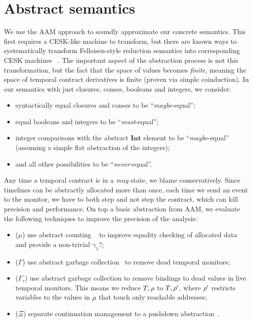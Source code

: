 \section{Abstract semantics}

We use the AAM approach to soundly approximate our concrete semantics.
%
This first requires a CESK-like machine to transform, but there are known ways to systematically transform Felleisen-style reduction semantics into corresponding CESK machines ~\citep{dvanhorn:Danvy-Nielsen:RS-04-26}.
%
The important aspect of the abstraction process is not this transformation, but the fact that the space of values becomes \emph{finite}, meaning the space of temporal contract derivatives is finite (proven via simple coinduction).
%
In our semantics with just closures, conses, booleans and integers, we consider:
\begin{itemize}
 \item syntactically equal closures and conses to be ``\emph{maybe}-equal'';
 \item equal booleans and integers to be ``\emph{must}-equal'';
 \item integer comparisons with the abstract $\mathbf{Int}$ element to be ``\emph{maybe}-equal'' (assuming a simple flat abstraction of the integers);
 \item and all other possibilities to be ``\emph{never}-equal''.
\end{itemize}
%
Any time a temporal contract is in a \emph{may} state, we blame conservatively.
%
Since timelines can be abstractly allocated more than once, each time we send an event to the monitor, we have to both step and not step the contract, which can kill precision and performance.
%
On top a basic abstraction from AAM, we evaluate the following techniques to improve the precision of the analysis:
\begin{itemize}
\item{($\mu$) use abstract counting ~\citep{dvanhorn:Might:2006:GammaCFA} to improve equality checking of allocated data and provide a non-trivial $\gamma_1?$;}
\item{($\Gamma$) use abstract garbage collection~\citep{dvanhorn:Might:2006:GammaCFA} to remove dead temporal monitors;}
\item{($\Gamma_\tau$) use abstract garbage collection to remove bindings to dead values in live temporal monitors.
%
This means we reduce $T,\rho$ to $T,\rho'$, where $\rho'$ restricts variables to the values in $\rho$ that touch only reachable addresses;}
\item{($\Xi$) separate continuation management to a pushdown abstraction~\citep{dvanhorn:Vardoulakis2011CFA2}.}%
\end{itemize}

